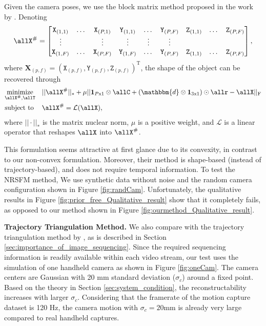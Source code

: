 Given the camera poses, we use the block matrix method proposed in the work by \citet{dai2014simple}. Denoting
\begin{equation}
\allX^\# = 
\begin{bmatrix}
\mathtt{X}_{(1,1)}& \dots& \mathtt{X}_{(P,1)} & \mathtt{Y}_{(1,1)}& \dots& \mathtt{Y}_{(P,F)} & \mathtt{Z}_{(1,1)}& \dots& \mathtt{Z}_{(P,F)} \\
\vdots   &  				& \vdots   & \vdots 		  & \vdots   & \vdots			  \\
\mathtt{X}_{(1,F)}& \dots& \mathtt{X}_{(P,F)} & \mathtt{Y}_{(1,F)}& \dots& \mathtt{Y}_{(P,F)} & \mathtt{Z}_{(1,1)}& \dots& \mathtt{Z}_{(P,F)}\nonumber		  
\end{bmatrix},
\end{equation}
where $\mathbf{X}_{(p,f)} = (\mathtt{X}_{(p,f)},\mathtt{Y}_{(p,f)},\mathtt{Z}_{(p,f)})^\text{T}$, the shape of the object can be recovered through 
\begin{equation}
\begin{aligned}
& \underset{\allX^\#, \allT}{\text{minimize}} &&
||\allX^\#||_* + \mu ||\mathbf{1}_{P\text{x}1} \otimes \allC + (\mathbbm{d} \otimes \mathbf{1}_{3\text{x}1}) \odot \allr - \allX||_{\text{F}}\\
&\text{subject to} && \allX^\# = \mathcal{L}(\allX), \nonumber
\end{aligned}
\end{equation}
where $||\cdot||_*$ is the matrix nuclear norm, $\mu$ is a positive weight, and $\mathcal{L}$ is a linear operator that reshapes $\allX$ into $\allX^\#$. 

This formulation seems attractive at first glance due to its convexity, in contrast to our non-convex formulation. Moreover, their method is shape-based (instead of trajectory-based), and does not require temporal information. 
To test the NRSFM method, We use synthetic data without noise and the random camera configuration shown in Figure \ref{fig:randCam}.
Unfortunately, the qualitative results in Figure \ref{fig:prior_free_Qualitative_result} show that it completely fails, as opposed to our method shown in Figure \ref{fig:ourmethod_Qualitative_result}. 

\textbf{Trajectory Triangulation Method.} We also compare with the trajectory triangulation method by  \citet{Valmadre_CVPR2012}, as is described in Section \ref{sec:importance_of_image_sequencing}. 
Since the required sequencing information is readily available within each video stream, our test uses the simulation of one handheld camera as shown in Figure \ref{fig:oneCam}. The camera centers are Gaussian with 20 mm standard deviation ($\sigma_c$) around a fixed point. %
Based on the theory in Section \ref{sec:system_condition}, the reconstructability increases with larger $\sigma_c$.
Considering that the framerate of the motion capture dataset is 120 Hz, the camera motion with  $\sigma_c = 20$mm is already very large compared to real handheld captures.

